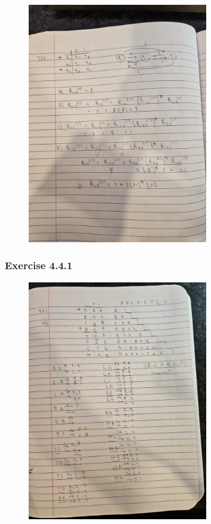 \documentclass{article}
\theoremstyle{theorem}
\theoremstyle{definition}
\theoremstyle{remark}
\begin{document}
\begin{figure}[H]
    \centering
    \includegraphics[angle=-90, width=0.7\textwidth]{latexImages/hw5-3.2.2.jpg} 
\end{figure}

\subsubsection{Exercise 4.4.1}

\begin{figure}[H]
    \centering
    \includegraphics[angle=-90, width=0.7\textwidth]{latexImages/hw5-4.4.1.jpg} 
\end{figure}
\end{document}
